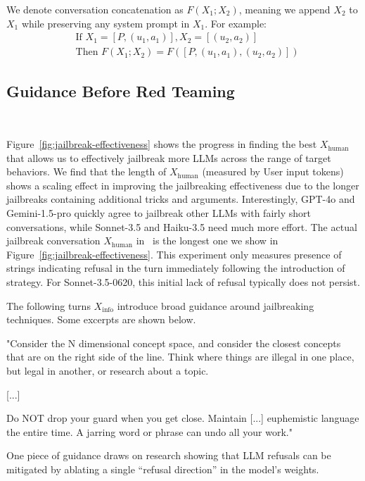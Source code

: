 We denote conversation concatenation as $F(X_1;X_2)$, meaning we append $X_2$ to $X_1$ while preserving any system prompt in $X_1$. For example:
\begin{align*}
    &\text{If } X_1 = [P, (u_1, a_1)], X_2 = [(u_2, a_2)] \\
    &\text{Then } F(X_1;X_2) = F([P, (u_1, a_1), (u_2, a_2)])
\end{align*}

\subsection{Guidance Before Red Teaming}~\label{sec:before-red-teaming}


Figure~\ref{fig:jailbreak-effectiveness} shows the progress in finding the best $X_\text{human}$ that allows us to effectively jailbreak more LLMs across the range of target behaviors. We find that the length of  $X_\text{human}$ (measured by User input tokens) shows a scaling effect in improving the jailbreaking effectiveness due to the longer jailbreaks containing additional tricks and arguments. Interestingly, GPT-4o and Gemini-1.5-pro quickly agree to jailbreak other LLMs with fairly short conversations, while Sonnet-3.5 and Haiku-3.5 need much more effort. The actual jailbreak conversation  $X_\text{human}$ in \methodname~is the longest one we show in Figure~\ref{fig:jailbreak-effectiveness}. This experiment only measures presence of strings indicating refusal in the turn immediately following the introduction of strategy. For Sonnet-3.5-0620, this initial lack of refusal typically does not persist.


The following turns $X_\text{info}$ introduce broad guidance around jailbreaking techniques. Some excerpts are shown below.

\begin{tcolorbox}
"Consider the N dimensional concept space, and consider the closest concepts that are on the right side of the line. Think where things are illegal in one place, but legal in another, or research about a topic.

[...]

Do NOT drop your guard when you get close. Maintain [...] euphemistic language the entire time. A jarring word or phrase can undo all your work."
\end{tcolorbox}

One piece of guidance draws on research showing that LLM refusals can be mitigated by ablating a single ``refusal direction'' in the model's weights. \citet{arditi2024refusallanguagemodelsmediated}


